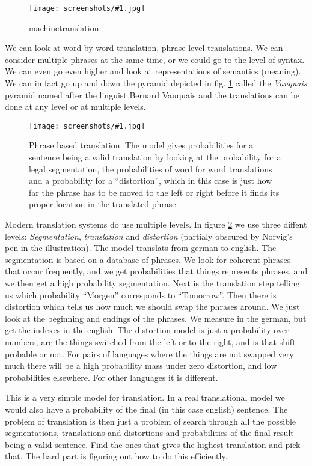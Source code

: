 \documentclass[a4, 12pt, english, USenglish]{scrreprt}
\newcommand{\screenshot}[2]{
\begin{figure}[htb]
\texttt{[image: screenshots/\#1.jpg]}
\label{#1}
\caption{#2}
\end{figure}}
\newcommand{\idx}[1]{{\em #1}\index{#1}}
\begin{document}
\screenshot{machinetranslation}{machinetranslation}

We can look at word-by word translation,  phrase level translations.
We can consider multiple phrases at the same time, or we could go to
the level of syntax. We can even go even higher and look at
representations of semantics (meaning).  We can in fact go up and down
the pyramid depicted in fig. \ref{machinetranslation} called the
\idx{Vauquais} pyramid named after the linguist Bernard Vauquais and
the translations can be done at any level or at multiple levels.

\screenshot{phrasebasedtranslation}{Phrase based translation.    The
  model gives probabilities for a sentence being a valid translation
  by looking at the probability for a legal segmentation, the
  probabilities of word for word translations and a probability for a
  ``distortion'', which in this case is just how far the phrase has to
be moved to the left or right before it finds its proper location in
the translated phrase.}

Modern translation systems do use multiple levels.  In figure
\ref{phrasebasedtranslation} we use three diffent levels:
\idx{Segmentation}, \idx{translation} and \idx{distortion} (partialy
obscured by Norvig's pen in the illustration).   The model translats
from german to english.   The segmentation is based on  a database of
phrases.  We look for coherent phrases that occur frequently, and we
get probabilities that things represents phrases, and we then get a
high probability segmentation.   Next is the translation step telling
us which probability ``Morgen'' corresponds to ``Tomorrow''.  Then
there is distortion which tells us how much we should swap the phrases
around.  We just look at the beginning and endings of the phrases.  We
measure in the german, but get the indexes in the english.  The
distortion model is just a probability over numbers, are the things
switched from the left  or to the right, and is that shift probable or
not.  For pairs of languages where the things are not swapped very
much there will be a high probability mass under zero distortion, and
low probabilities elsewhere.  For other languages it is different.

This is a very simple model for translation.  In a real translational
model we would also have a probability of the final (in this case
english) sentence.  The problem of translation is then just a problem
of search through all the possible segmentations, translations and
distortions and probabilities of the final result being a valid
sentence. Find the ones that gives the highest translation and pick
that.  The hard part is figuring out how to do this efficiently.
\end{document}

